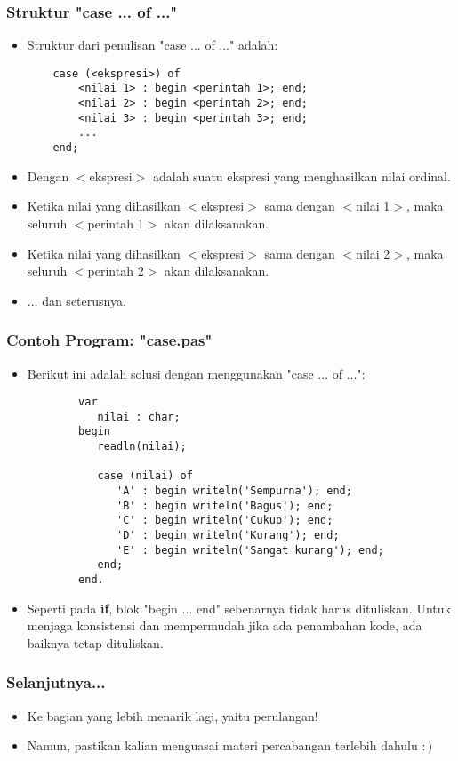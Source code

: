\documentclass{beamer}
\begin{document}
\begin{frame}[fragile]
\frametitle{Struktur "case ... of ..."}
\begin{itemize}
	\item Struktur dari penulisan "case ... of ..." adalah:
	\begin{lstlisting}
	case (<ekspresi>) of
	    <nilai 1> : begin <perintah 1>; end;
	    <nilai 2> : begin <perintah 2>; end;
	    <nilai 3> : begin <perintah 3>; end;
	    ...
	end;
	\end{lstlisting}
	
	\item Dengan $<$ekspresi$>$ adalah suatu ekspresi yang menghasilkan \alert{nilai ordinal}.
	\item Ketika nilai yang dihasilkan $<$ekspresi$>$ sama dengan $<$nilai 1$>$, maka seluruh $<$perintah 1$>$ akan dilaksanakan.
	\item Ketika nilai yang dihasilkan $<$ekspresi$>$ sama dengan $<$nilai 2$>$, maka seluruh $<$perintah 2$>$ akan dilaksanakan.
	\item ... dan seterusnya.
\end{itemize}
\end{frame}

\begin{frame}[fragile]
\frametitle{Contoh Program: "case.pas"}
\begin{itemize}
	\item Berikut ini adalah solusi dengan menggunakan "case ... of ...":
	\begin{lstlisting}
		var
		   nilai : char;
		begin
		   readln(nilai);
		
		   case (nilai) of
		      'A' : begin writeln('Sempurna'); end;
		      'B' : begin writeln('Bagus'); end;
		      'C' : begin writeln('Cukup'); end;
		      'D' : begin writeln('Kurang'); end;
		      'E' : begin writeln('Sangat kurang'); end;
		   end;
		end.
	\end{lstlisting}
	\item Seperti pada \textbf{if}, blok "begin ... end" sebenarnya tidak harus dituliskan. Untuk menjaga konsistensi dan mempermudah \newline jika ada penambahan kode, ada baiknya tetap dituliskan.
\end{itemize}
\end{frame}

\begin{frame}
\frametitle{Selanjutnya...}
\begin{itemize}
	\item Ke bagian yang lebih menarik lagi, yaitu perulangan!
	\item Namun, pastikan kalian menguasai materi percabangan terlebih dahulu $:)$
\end{itemize}
\end{frame}
\end{document}
